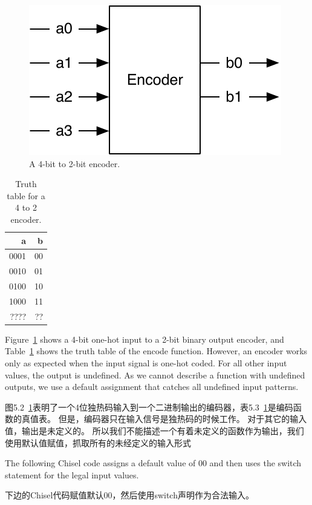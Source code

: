 \documentclass[%
    10pt,
    headinclude, footexclude,
    openright, %
    notitlepage,
    cleardoubleempty,
    headsepline,
    pointlessnumbers,
    bibtotoc, idxtotoc,
    ]{scrbook}
\newcommand{\scale}{0.7}
\begin{document}
\begin{figure}
  \centering
  \includegraphics[scale=\scale]{figures/encoder}
  \caption{A 4-bit to 2-bit encoder.}
  \label{fig:encoder}
\end{figure}


\begin{table}
 \centering
 \label{tab:encoder}
  \begin{tabular}{rr}
    \toprule
    a & b \\
    \midrule
    0001 & 00 \\
    0010 & 01 \\
    0100 & 10 \\
    1000 & 11 \\
    ???? & ?? \\
    \bottomrule 
  \end{tabular} 
  \caption{Truth table for a 4 to 2 encoder.}
\end{table}

Figure~\ref{fig:encoder} shows a 4-bit one-hot input to a 2-bit binary output encoder, and
Table~\ref{tab:encoder} shows the truth table of the encode function. However, an encoder
works only as expected when the input signal is one-hot coded. For all other input values, the output
is undefined. As we cannot describe a function with undefined outputs, we use a default
assignment that catches all undefined input patterns.

图5.2~\ref{fig:encoder}表明了一个4位独热码输入到一个二进制输出的编码器，表5.3~\ref{tab:encoder}是编码函数的真值表。
但是，编码器只在输入信号是独热码的时候工作。
对于其它的输入值，输出是未定义的。
所以我们不能描述一个有着未定义的函数作为输出，我们使用默认值赋值，抓取所有的未经定义的输入形式

The following Chisel code assigns a default value of 00 and then uses the switch statement
for the legal input values.

下边的Chisel代码赋值默认00，然后使用switch声明作为合法输入。
\end{document}
